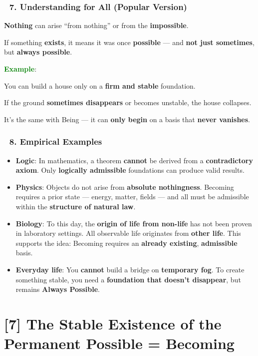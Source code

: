 \documentclass[12pt]{article}
\begin{document}
\subsubsection*{🔹 7. Understanding for All (Popular Version)}
\textbf{Nothing} can arise ``from nothing'' or from the \textbf{impossible}.

If something \textbf{exists}, it means it was once \textbf{possible} — and \textbf{not just sometimes}, but \textbf{always possible}.

\bigskip
\textcolor{green}{\textbf{Example}}:

You can build a house only on a \textbf{firm and stable} foundation.

If the ground \textbf{sometimes disappears} or becomes unstable, the house collapses.

It’s the same with Being — it can \textbf{only begin} on a basis that \textbf{never vanishes}.

\subsubsection*{🔹 8. Empirical Examples}
\begin{itemize}
\item \textbf{Logic}: In mathematics, a theorem \textbf{cannot} be derived from a \textbf{contradictory axiom}. Only \textbf{logically admissible} foundations can produce valid results.
\item \textbf{Physics}: Objects do not arise from \textbf{absolute nothingness}. Becoming requires a prior state — energy, matter, fields — and all must be admissible within the \textbf{structure of natural law}.
\item \textbf{Biology}: To this day, the \textbf{origin of life from non-life} has not been proven in laboratory settings. All observable life originates from \textbf{other life}. This supports the idea: Becoming requires an \textbf{already existing}, \textbf{admissible} basis.
\item \textbf{Everyday life}: You \textbf{cannot} build a bridge on \textbf{temporary fog}. To create something stable, you need a \textbf{foundation that doesn’t disappear}, but remains \textbf{Always Possible}.
\end{itemize}

\section*{[7] The Stable Existence of the Permanent Possible = Becoming}
\end{document}
